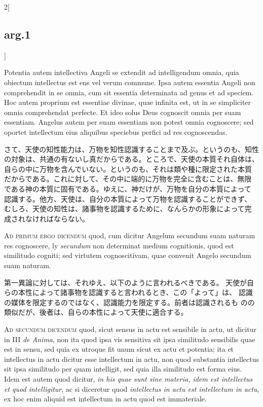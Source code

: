 \documentclass[paper=a4paper,fontsize=10pt,jafontsize=9pt,titlepage]{jlreq}
\begin{document}
\begin{paracol}{2}[\subsection{arg.1}]
\switchcolumn*

Potentia autem
intellectiva Angeli se extendit ad intelligendum omnia, quia obiectum
intellectus est ens vel verum commune. Ipsa autem essentia Angeli non
comprehendit in se omnia, cum sit essentia determinata ad genus et ad
speciem. Hoc autem proprium est essentiae divinae, quae infinita est, ut
in se simpliciter omnia comprehendat perfecte. Et ideo solus Deus
cognoscit omnia per suam essentiam. Angelus autem per suam essentiam non
potest omnia cognoscere; sed oportet intellectum eius aliquibus
speciebus perfici ad res cognoscendas.

\switchcolumn

さて、天使の知性能力は、万物を知性認識することまで及ぶ。というのも、知性
 の対象は、共通の有ないし真だからである。ところで、天使の本質それ自体は、
 自らの中に万物を含んでいない。というのも、それは類や種に限定された本質
 だからである。これに対して、その中に端的に万物を完全に含むことは、無限
 である神の本質に固有である。ゆえに、神だけが、万物を自分の本質によって
 認識する。他方、天使は、自分の本質によって万物を認識することができず、
 むしろ、天使の知性は、諸事物を認識するために、なんらかの形象によって完
 成されなければならない。

\switchcolumn*[\subsection{ad.1}]

{\scshape Ad primum ergo dicendum} quod, cum dicitur Angelum secundum
suam naturam res cognoscere, ly {\itshape secundum} non determinat medium
cognitionis, quod est similitudo cogniti; sed virtutem cognoscitivam,
quae convenit Angelo secundum suam naturam.

\switchcolumn

第一異論に対しては、それゆえ、以下のように言われるべきである。
天使が自らの本性によって諸事物を認識すると言われるとき、この「よって」は、
 認識の媒体を限定するのではなく、認識能力を限定する。前者は認識されるも
 のの類似だが、後者は、自らの本性によって天使に適合する。

\switchcolumn*[\subsection{ad.2}]

{\scshape Ad secundum dicendum} quod, sicut sensus in actu est sensibile
in actu, ut dicitur in III {\itshape de Anima}, non ita quod ipsa vis sensitiva sit
ipsa similitudo sensibilis quae est in sensu, sed quia ex utroque fit
unum sicut ex actu et potentia; ita et intellectus in actu dicitur esse
intellectum in actu, non quod substantia intellectus sit ipsa similitudo
per quam intelligit, sed quia illa similitudo est forma eius. Idem est
autem quod dicitur, {\itshape in his quae sunt sine materia, idem est intellectus
et quod intelligitur}, ac si diceretur quod {\itshape intellectus in actu est
intellectum in actu}, ex hoc enim aliquid est intellectum in actu quod
est immateriale.


\end{paracol}
\end{document}
